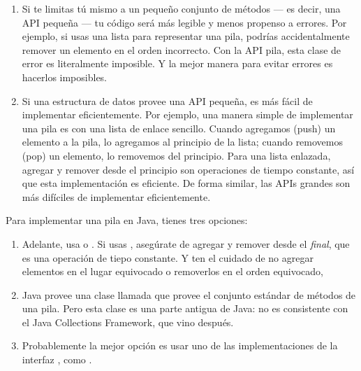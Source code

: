 \documentclass[12pt]{book}
\theoremstyle{exercise}
\begin{document}
\begin{enumerate}

\item
  Si te limitas tú mismo a un pequeño conjunto de métodos --- es decir,
  una API pequeña --- tu código será más legible y menos propenso a
  errores. Por ejemplo, si usas una lista para representar una pila, podrías
  accidentalmente remover un elemento en el orden incorrecto. Con la API
  pila, esta clase de error es literalmente imposible. Y la mejor manera para
  evitar errores es hacerlos imposibles.

\item
  Si una estructura de datos provee una API pequeña, es más fácil de
  implementar eficientemente. Por ejemplo, una manera simple de
  implementar una pila es con una lista de enlace sencillo. Cuando
  agregamos (push) un elemento a la pila, lo agregamos al principio
  de la lista; cuando removemos (pop) un elemento, lo removemos del
  principio. Para una lista enlazada, agregar y remover desde el principio
  son operaciones de tiempo constante, así que esta implementación es
  eficiente. De forma similar, las APIs grandes son más difíciles de
  implementar eficientemente.

\end{enumerate}


Para implementar una pila en Java, tienes tres opciones:

\begin{enumerate}

\item
  Adelante, usa   o . Si usas
  , asegúrate de agregar y remover desde el \emph{final},
  que es una operación de tiepo constante. Y ten el cuidado de no agregar
  elementos en el lugar equivocado o removerlos en el orden equivocado,

\item
  Java provee una clase llamada  que provee el conjunto estándar
  de métodos de una pila. Pero esta clase es una parte antigua de Java: no es
  consistente con el Java Collections Framework, que vino después.

\item
  Probablemente la mejor opción es usar uno de las implementaciones de la
  interfaz , como .

\end{enumerate}
\end{document}

